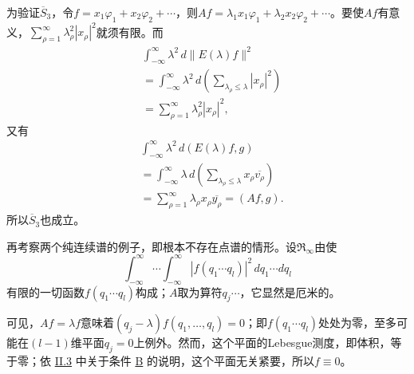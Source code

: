 \documentclass[fontsize=13pt,twoside,openany,headings=normal,parskip=false,bookmarkpackage=false,DIV=calc]{scrbook}
\begin{document}
为验证$\hyperref[cond:II.Sbar3]{\overline{S}_3}$，令$f=x_1\varphi_1+x_2\varphi_2+\cdots$，则$Af=\lambda_1x_1\varphi_1+\lambda_2x_2\varphi_2+\cdots$。要使$Af$有意义，$\sum_{\rho=1}^\infty\lambda_\rho^2|x_\rho|^2$就须有限。而
\begin{align*}
&\int_{-\infty}^{\infty}\lambda^2\,d\|E(\lambda)f\|^2\\
&=\int_{-\infty}^{\infty}\lambda^2\,d\left(\sum_{\lambda_\rho\leq\lambda}|x_\rho|^2\right)\\
&=\sum_{\rho=1}^\infty\lambda_\rho^2|x_\rho|^2,
\end{align*}
又有
\begin{align*}
&\int_{-\infty}^{\infty}\lambda^2\,d(E(\lambda)f,g)\\
&=\int_{-\infty}^{\infty}\lambda\,d\left(\sum_{\lambda_\rho\leq\lambda}x_\rho\overline{v_\rho}\right)\\
&=\sum_{\rho=1}^\infty\lambda_\rho x_\rho\overline{y_\rho}=(Af,g).
\end{align*}
所以$\hyperref[cond:II.Sbar3]{\overline{S}_3}$也成立。

再考察两个纯连续谱的例子，即根本不存在点谱的情形。设$\mathfrak{R}_\infty$由使
\[
\int_{-\infty}^{\infty}\cdots\int_{-\infty}^{\infty}|f(q_1\cdots q_l)|^2\,dq_1\cdots dq_l
\]
有限的一切函数$f(q_1\cdots q_l)$构成；$A$取为算符$q_j\cdots$，它显然是厄米的。

可见，$Af=\lambda f$意味着$(q_j-\lambda)f(q_1,\allowbreak \ldots,\allowbreak q_l)=0$；即$f(q_1\cdots q_l)$处处为零，至多可能在$(l-1)$维平面$q_j=0$上例外。然而，这个平面的Lebesgue测度，即体积，等于零；依 \hyperref[sec:II.3]{II.3} 中关于条件 \hyperref[ax:II.B]{B} 的说明，这个平面无关紧要，所以$f\equiv0$。
\end{document}
